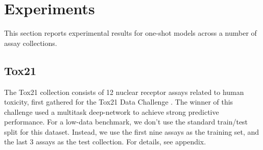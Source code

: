 \documentclass[journal=jacsat,manuscript=article]{achemso}
\begin{document}
\section{Experiments}
This section reports experimental results for one-shot models across a number of assay collections.
\subsection{Tox21}
The Tox21 collection consists of 12 nuclear receptor assays related to human toxicity, first gathered for the Tox21 Data Challenge \cite{tox21}. The winner of this challenge used a multitask deep-network \cite{unterthiner2015toxicity} to achieve strong predictive performance. For a low-data benchmark, we don't use the standard train/test split for this dataset. Instead, we use the first nine assays as the training set, and the last 3 assays as the test collection. For details, see appendix.
\end{document}
